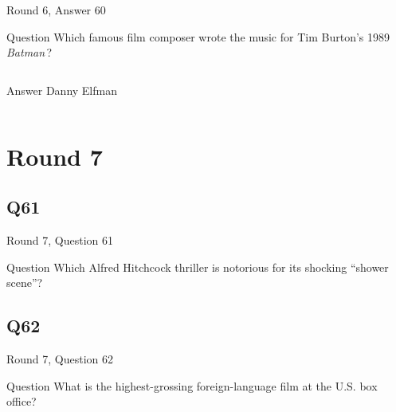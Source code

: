 \documentclass[11pt]{beamer}
\begin{document}
\begin{frame}[t]{Round 6, Answer 60}
  \vspace{2em}
  \begin{block}{Question}
    Which famous film composer wrote the music for Tim Burton's 1989 \emph{Batman}\,?
  \end{block}
  \pause{}
  \begin{columns}[T,totalwidth=\linewidth]
    \begin{column}{0.35\linewidth}
      \begin{block}{Answer}
        Danny Elfman
      \end{block}
    \end{column}
    \begin{column}{0.6\linewidth}
      \begin{center}
        \texttt{[image: \{Images/batman-complete-score]}.jpg}
      \end{center}
    \end{column}
  \end{columns}
\end{frame}


\section{Round 7}


\subsection*{Q61}
\begin{frame}[t]{Round 7, Question 61}
  \vspace{2em}
  \begin{block}{Question}
    Which Alfred Hitchcock thriller is notorious for its shocking ``shower scene''?
  \end{block}
\end{frame}


\subsection*{Q62}
\begin{frame}[t]{Round 7, Question 62}
  \vspace{2em}
  \begin{block}{Question}
    What is the highest-grossing foreign-language film at the U.S. box office?
  \end{block}
\end{frame}
\end{document}
